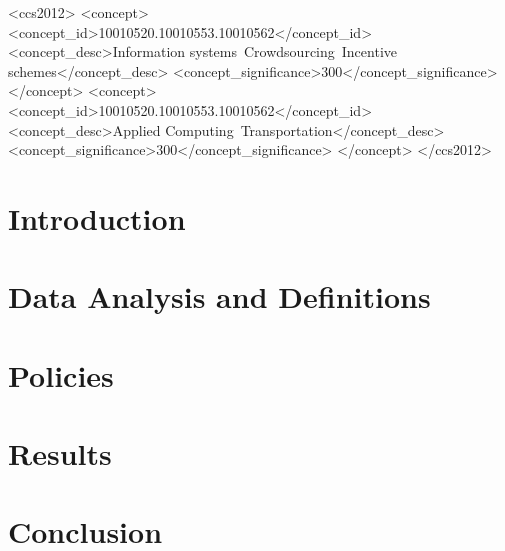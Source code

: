 \documentclass{sigchi}
\begin{document}
%
%
\begin{CCSXML}
<ccs2012>
 <concept>
  <concept_id>10010520.10010553.10010562</concept_id>
  <concept_desc>Information systems~Crowdsourcing~Incentive schemes</concept_desc>
  <concept_significance>300</concept_significance>
 </concept>
  <concept>
  <concept_id>10010520.10010553.10010562</concept_id>
  <concept_desc>Applied Computing~Transportation</concept_desc>
  <concept_significance>300</concept_significance>
 </concept>
</ccs2012>
\end{CCSXML}





\maketitle

\section{Introduction}


\section{Data Analysis and Definitions}\label{sec:angel_data}




\section{Policies}\label{sec:angel_policies}



\section{Results}\label{sec:angel_results}



\section{Conclusion}\label{sec:angel_conclusion}



%


\balance{}



\end{document}
